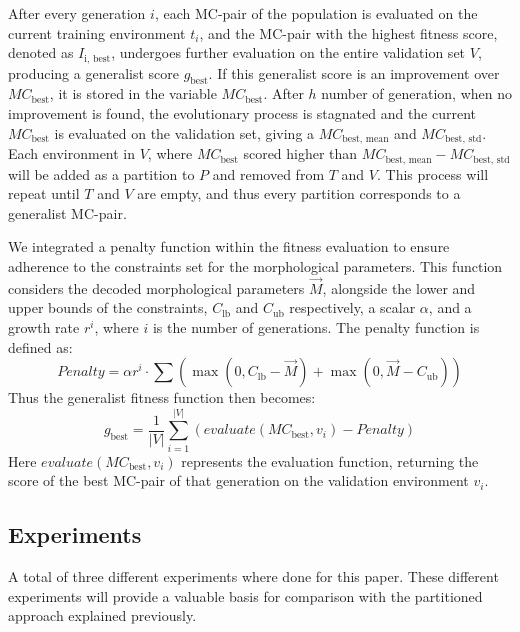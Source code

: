         After every generation $i$, each MC-pair of the population is evaluated on the current training environment $t_i$, and the MC-pair with the highest fitness score, denoted as $I_{\text{i, best}}$, undergoes further evaluation on the entire validation set $V$, producing a generalist score $g_{\text{best}}$. If this generalist score is an improvement over $MC_{\text{best}}$, it is stored in the variable $MC_{\text{best}}$. After $h$ number of generation, when no improvement is found, the evolutionary process is stagnated and the current $MC_{\text{best}}$ is evaluated on the validation set, giving a $MC_{\text{best, mean}}$ and $MC_{\text{best, std}}$. Each environment in $V$, where $MC_{\text{best}}$ scored higher than $MC_{\text{best, mean}} - MC_{\text{best, std}}$ will be added as a partition to $P$ and removed from $T$ and $V$. This process will repeat until $T$ and $V$ are empty, and thus every partition corresponds to a generalist MC-pair. 

        We integrated a penalty function within the fitness evaluation to ensure adherence to the constraints set for the morphological parameters. This function considers the decoded morphological parameters $\overrightarrow{M}$, alongside the lower and upper bounds of the constraints, $C_\text{lb}$ and $C_\text{ub}$ respectively, a scalar $\alpha$, and a growth rate $r^i$, where $i$ is the number of generations. The penalty function is defined as:
        {\small
            \begin{equation}
                Penalty = \alpha r^i \cdot \sum(
                    \max(0, C_\text{lb} - \overrightarrow{M}) + 
                    \max(0, \overrightarrow{M} - C_\text{ub})
                )
            \end{equation}
        }
        Thus the generalist fitness function then becomes:
        {\small
            \begin{equation}
                g_{\text{best}} = \frac{1}{|V|} \sum_{i=1}^{|V|}(
                    evaluate(MC_{\text{best}}, v_i) - Penalty
                ) 
            \end{equation}
        }
        Here $evaluate(MC_{\text{best}}, v_i)$ represents the evaluation function, returning the score of the best MC-pair of that generation on the validation environment $v_i$.

    \subsection{Experiments}
        A total of three different experiments where done for this paper. These different experiments will provide a valuable basis for comparison with the partitioned approach explained previously.
